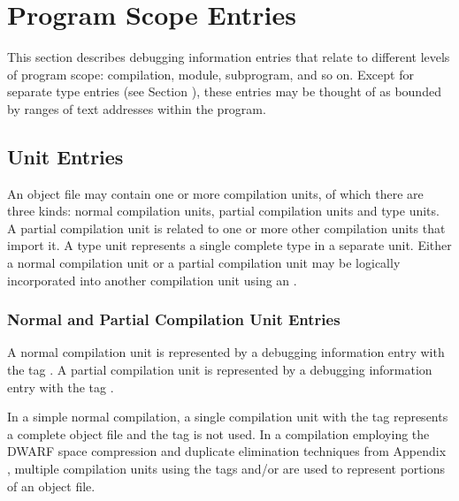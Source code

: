 \chapter{Program Scope Entries}
\label{chap:programscopeentries} 
This section describes debugging information entries that
relate to different levels of program scope: compilation,
module, subprogram, and so on. Except for separate type
entries (see Section ), 
these entries may be thought of
as bounded by ranges of text addresses within the program.

\section{Unit Entries}
An object file may contain one or more compilation units,
of which there are three kinds: normal compilation units,
partial compilation units and type units. A partial compilation
unit is related to one or more other compilation units that
import it. A type unit represents a single complete type in a
separate unit. Either a normal compilation unit or a partial
compilation unit may be logically incorporated into another
compilation unit using an 
.

\subsection[Normal and Partial CU Entries]{Normal and Partial Compilation Unit Entries}
\label{chap:normalandpartialcompilationunitentries}

A normal compilation unit is represented by a debugging
information entry with the 
tag . A partial
compilation unit is represented by a debugging information
entry with the 
tag .

In a simple normal compilation, a single compilation unit with
the tag 
 represents a complete object file
and the tag 
 is not used. 
In a compilation
employing the DWARF space compression and duplicate elimination
techniques from 
Appendix , 
multiple compilation units using
the tags 
 and/or 
 are
used to represent portions of an object file.

